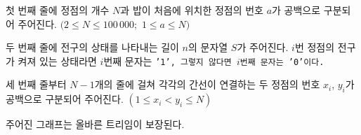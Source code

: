 첫 번째 줄에 정점의 개수 $N$과 밥이 처음에 위치한 정점의 번호 $a$가 공백으로 구분되어 주어진다. $(2 \le N \le 100\,000;$ $1 \le a \le N)$

두 번째 줄에 전구의 상태를 나타내는 길이 $n$의 문자열 $S$가 주어진다. $i$번 정점의 전구가 켜져 있는 상태라면 $i$번째 문자는 \tt{'1'}, 그렇지 않다면 $i$번째 문자는 \tt{'0'}이다.

세 번째 줄부터 $N-1$개의 줄에 걸쳐 각각의 간선이 연결하는 두 정점의 번호 $x_i$, $y_i$가 공백으로 구분되어 주어진다. $(1 \le x_i < y_i \le N)$

주어진 그래프는 올바른 트리임이 보장된다.
